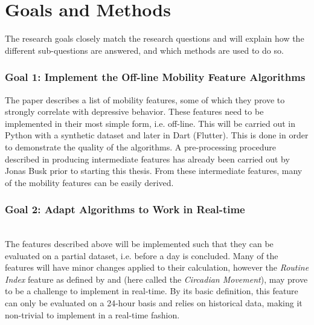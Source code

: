 \section{Goals and Methods}


The research goals closely match the research questions and will explain how the different sub-questions are answered, and which methods are used to do so.

\subsubsection*{Goal 1: Implement the Off-line Mobility Feature Algorithms}
The paper \cite{Saeb2015} describes a list of mobility features, some of which they prove to strongly correlate with depressive behavior. These features need to be implemented in their most simple form, i.e. off-line. This will be carried out in Python with a synthetic dataset and later in Dart (Flutter). This is done in order to demonstrate the quality of the algorithms. A pre-processing procedure described in \cite{sparse-location-2014} producing intermediate features has already been carried out by Jonas Busk prior to starting this thesis. From these intermediate features, many of the mobility features can be easily derived. 
\subsubsection*{Goal 2: Adapt Algorithms to Work in Real-time}\\
The features described above will be implemented such that they can be evaluated on a partial dataset, i.e. before a day is concluded. Many of the features will have minor changes applied to their calculation, however the \textit{Routine Index} feature as defined by \cite{extraction-of-behavioural-features} and \cite{Saeb2015}  (here called the\textit{ Circadian Movement}), may prove to be a challenge to implement in real-time. By its basic definition, this feature can only be evaluated on a 24-hour basis and relies on historical data, making it non-trivial to implement in a real-time fashion. 

